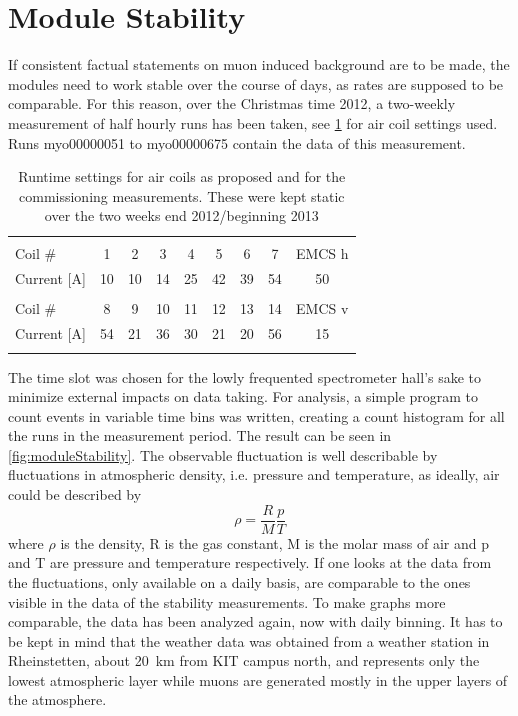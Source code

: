   \section{Module Stability}
  \label{ch:Analysis:sec:Module Stability}
  If consistent factual statements on muon induced background are to be made, the modules need to work stable over the course of days, as rates are supposed to be comparable. For this reason, over the Christmas time 2012, a two-weekly measurement of half hourly runs has been taken, see \ref{tab:airCoilSettingsChristmas} for air coil settings used. Runs myo00000051 to myo00000675 contain the data of this measurement.
  \begin{table}
  \centering
   \begin{tabular}{|l|ccccccc|c|}
    \hline
    &&&&&&&&\\
    Coil \#	&1	&2	&3	&4	&5	&6	&7	&EMCS h	\\
    Current [A]	&10	&10	&14	&25	&42	&39	&54	&50  	\\
    &&&&&&&&\\
    Coil \# 	&8	&9	&10	&11	&12	&13	&14	&EMCS v	\\
    Current [A]	&54	&21	&36	&30	&21	&20	&56	&15    	\\
    &&&&&&&&\\
    \hline
   \end{tabular}
  \caption[LFCS settings stability measurement]{Runtime settings for air coils as proposed and for the commissioning measurements. These were kept static over the two weeks end 2012/beginning 2013}
  \label{tab:airCoilSettingsChristmas}
  \end{table}
  The time slot was chosen for the lowly frequented spectrometer hall's sake to minimize external impacts on data taking. For analysis, a simple program to count events in variable time bins was written, creating a count histogram for all the runs in the measurement period. The result can be seen in \ref{fig:moduleStability}. The observable fluctuation is well describable by fluctuations in atmospheric density, i.e. pressure and temperature, as ideally, air could be described by
  \begin{equation}
  	\rho = \frac{R}{M}\frac{p}{T}
  \end{equation}
  where $\rho$ is the density, R is the gas constant, M is the molar mass of air and p and T are pressure and temperature respectively.
  If one looks at the data from \cite{wetterCom} the fluctuations, only available on a daily basis, are comparable to the ones visible in the data of the stability measurements. To make graphs more comparable, the data has been analyzed again, now with daily binning. It has to be kept in mind that the weather data was obtained from a weather station in Rheinstetten, about \SI{20}{\kilo\meter} from KIT campus north, and represents only the lowest atmospheric layer while muons are generated mostly in the upper layers of the atmosphere.
